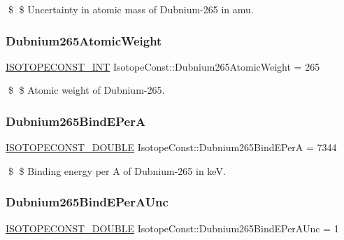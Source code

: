 \$ \$ Uncertainty in atomic mass of Dubnium-\/265 in amu. \mbox{\label{group___isotope_const-_dubnium-_db265_gaa4de48e134df8471b54263280b15cced}} 
\subsubsection{\texorpdfstring{Dubnium265\+Atomic\+Weight}{Dubnium265AtomicWeight}}
{\footnotesize\ttfamily \mbox{\hyperlink{group___isotope_const-_macros_ga5f18360b3e99483a35c32d789e62621c}{I\+S\+O\+T\+O\+P\+E\+C\+O\+N\+S\+T\+\_\+\+I\+NT}} Isotope\+Const\+::\+Dubnium265\+Atomic\+Weight = 265}

\$ \$ Atomic weight of Dubnium-\/265. \mbox{\label{group___isotope_const-_dubnium-_db265_gac030febef1bf962a83b286e206a4cbc1}} 
\subsubsection{\texorpdfstring{Dubnium265\+Bind\+E\+PerA}{Dubnium265BindEPerA}}
{\footnotesize\ttfamily \mbox{\hyperlink{group___isotope_const-_macros_ga8f45a7272ce02c0b4c65c44636ed719a}{I\+S\+O\+T\+O\+P\+E\+C\+O\+N\+S\+T\+\_\+\+D\+O\+U\+B\+LE}} Isotope\+Const\+::\+Dubnium265\+Bind\+E\+PerA = 7344}

\$ \$ Binding energy per A of Dubnium-\/265 in keV. \mbox{\label{group___isotope_const-_dubnium-_db265_gab8e4e1cea740634710be0c23e35cf5bd}} 
\subsubsection{\texorpdfstring{Dubnium265\+Bind\+E\+Per\+A\+Unc}{Dubnium265BindEPerAUnc}}
{\footnotesize\ttfamily \mbox{\hyperlink{group___isotope_const-_macros_ga8f45a7272ce02c0b4c65c44636ed719a}{I\+S\+O\+T\+O\+P\+E\+C\+O\+N\+S\+T\+\_\+\+D\+O\+U\+B\+LE}} Isotope\+Const\+::\+Dubnium265\+Bind\+E\+Per\+A\+Unc = 1}

